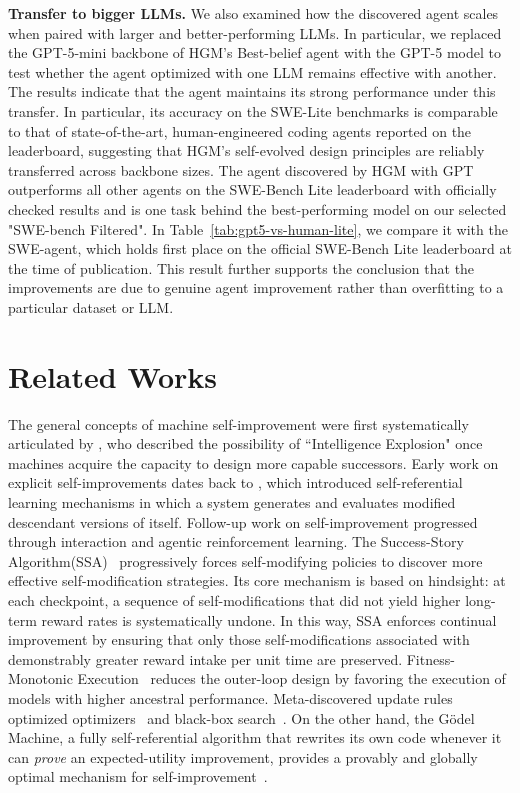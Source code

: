 \documentclass{article} %
\begin{document}
\textbf{Transfer to bigger LLMs.} We also examined how the discovered agent scales when paired with larger and better-performing LLMs. In particular, we replaced the GPT-5-mini backbone of HGM's Best-belief agent with the GPT-5 model to test whether the agent optimized with one LLM remains effective with another. The results indicate that the agent maintains its strong performance under this transfer. In particular, its accuracy on the SWE-Lite benchmarks is comparable to that of state-of-the-art, human-engineered coding agents reported on the leaderboard, suggesting that HGM’s self-evolved design principles are reliably transferred across backbone sizes. The agent discovered by HGM with GPT outperforms all other agents on the SWE-Bench Lite leaderboard with officially checked results and is one task behind the best-performing model on our selected "SWE-bench Filtered". In Table~\ref{tab:gpt5-vs-human-lite}, we compare it with the SWE-agent, which holds first place on the official SWE-Bench Lite leaderboard at the time of publication. This result further supports the conclusion that the improvements are due to genuine agent improvement rather than overfitting to a particular dataset or LLM.


\section{Related Works}

The general concepts of machine self-improvement were first systematically articulated by \citet{good1966speculations}, who described the possibility of ``Intelligence Explosion" once machines acquire the capacity to design more capable successors. Early work on explicit self-improvements dates back to \citet{Schmidhuber1987EvolutionaryPI}, which introduced self-referential learning mechanisms in which a system generates and evaluates modified descendant versions of itself.
Follow-up work on self-improvement progressed through interaction and agentic reinforcement learning. 
The Success-Story Algorithm(SSA)~\citep{schmidhuber1996multi, schmidhuber1997shifting}  progressively forces self-modifying policies to discover more effective self-modification strategies. Its core mechanism is based on hindsight: at each checkpoint, a sequence of self-modifications that did not yield higher long-term reward rates is systematically undone. In this way, SSA enforces continual improvement by ensuring that only those self-modifications associated with demonstrably greater reward intake per unit time are preserved.
Fitness-Monotonic Execution~\citep{kirsch2022self,kirsch2022eliminating} reduces the outer-loop design by favoring the execution of models with higher ancestral performance. Meta-discovered update rules optimized optimizers~\citep{metz2021training} and black-box search~\citep{lange2023discovering}. 
On the other hand, the G\"odel Machine, a fully self-referential algorithm that rewrites its own code whenever it can \emph{prove} an expected-utility improvement, provides a provably and globally optimal mechanism for self-improvement~\citep{Schmidhuber:03gm}.
\end{document}
